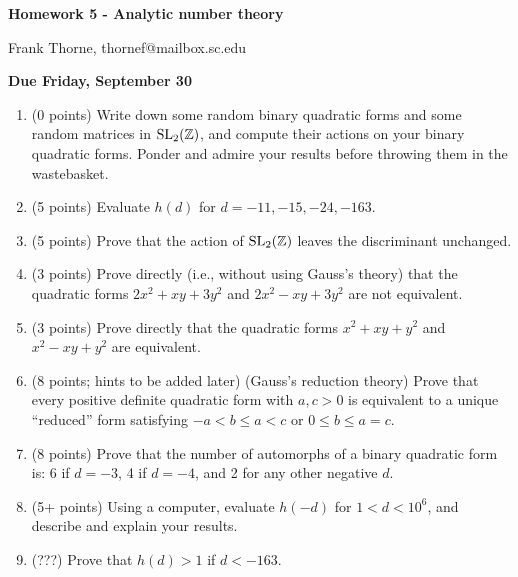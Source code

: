 \documentclass[12pt]{article}
\begin{document}
\setlength{\topmargin}{-2mm}





\begin{center}{\bf Homework 5 - Analytic number theory}
\end{center}
\begin{center}Frank Thorne, thornef@mailbox.sc.edu
\end{center}
\begin{center}
{\bf Due Friday, September 30}
\end{center}
\begin{enumerate}
\item (0 points)
Write down some random binary quadratic forms and some random matrices in $\textnormal{SL}_2(\mathbb{Z})$,
and compute their actions on your binary quadratic forms. Ponder and admire your results before
throwing them in the wastebasket.

\item (5 points)
Evaluate $h(d)$ for $d = -11, -15, -24, -163$.

\item (5 points)
Prove that the action of $\textnormal{SL}_2(\mathbb{Z})$ leaves the discriminant unchanged.

\item (3 points)
Prove directly (i.e., without using Gauss's theory) 
that the quadratic forms $2 x^2 + xy + 3y^2$ and $2 x^2 - xy + 3 y^2$ are
not equivalent.

\item (3 points)
Prove directly that the quadratic forms $x^2 + xy + y^2$ and $x^2 - xy + y^2$
are equivalent.

\item (8 points; hints to be added later)
(Gauss's reduction theory) Prove that every positive definite quadratic form with $a, c > 0$ is equivalent to
a unique ``reduced'' form satisfying $-a < b \leq a < c$ or $0 \leq b \leq a = c$.

\item (8 points)
Prove that the number of automorphs of a binary quadratic form is: 6 if $d = -3$, 4 if $d = -4$,
and 2 for any other negative $d$.

\item (5+ points)
Using a computer, evaluate $h(-d)$ for $1 < d < 10^6$, and describe and explain your results.

\item (???)
Prove that $h(d) > 1$ if $d < -163$.

\end{enumerate}
\end{document}
